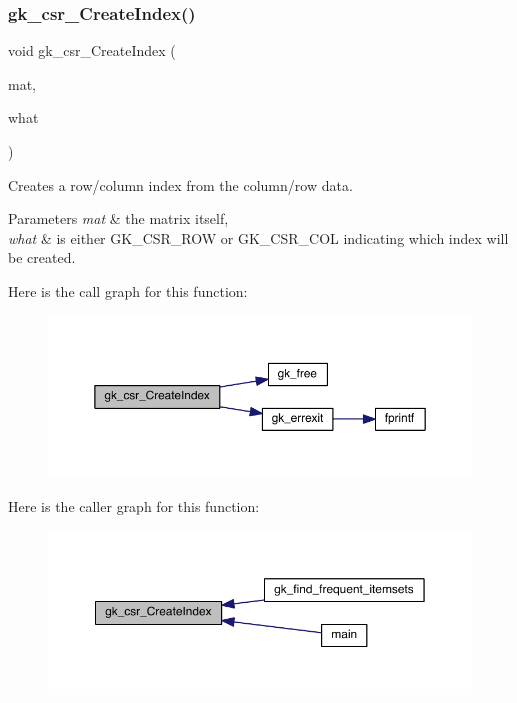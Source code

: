 \subsubsection{\texorpdfstring{gk\+\_\+csr\+\_\+\+Create\+Index()}{gk\_csr\_CreateIndex()}}
{\footnotesize\ttfamily void gk\+\_\+csr\+\_\+\+Create\+Index (\begin{DoxyParamCaption}\item[{\hyperlink{a00634}{gk\+\_\+csr\+\_\+t} $\ast$}]{mat,  }\item[{int}]{what }\end{DoxyParamCaption})}

Creates a row/column index from the column/row data. 
\begin{DoxyParams}{Parameters}
{\em mat} & the matrix itself, \\
\hline
{\em what} & is either G\+K\+\_\+\+C\+S\+R\+\_\+\+R\+OW or G\+K\+\_\+\+C\+S\+R\+\_\+\+C\+OL indicating which index will be created. \\
\hline
\end{DoxyParams}
Here is the call graph for this function\+:\nopagebreak
\begin{figure}[H]
\begin{center}
\leavevmode
\includegraphics[width=350pt]{a00023_a8bdd383ab80fe76507463f59c3d2863a_cgraph}
\end{center}
\end{figure}
Here is the caller graph for this function\+:\nopagebreak
\begin{figure}[H]
\begin{center}
\leavevmode
\includegraphics[width=350pt]{a00023_a8bdd383ab80fe76507463f59c3d2863a_icgraph}
\end{center}
\end{figure}
\mbox{\label{a00023_a24144cf4c30d5ec4ed8b488d371476b3}} 
